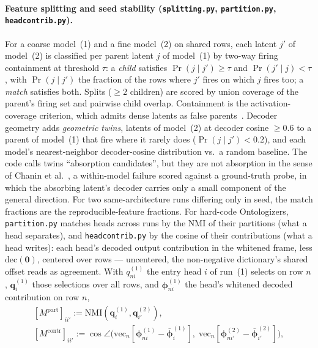 \paragraph{Feature splitting and seed stability (\texttt{splitting.py},
\texttt{partition.py}, \texttt{headcontrib.py}).}
For a coarse model~(1) and a fine model~(2) on shared rows, each latent
$j'$ of model~(2) is classified per parent latent $j$ of model~(1) by
two-way firing containment at threshold $\tau$: a \emph{child} satisfies
$\Pr(j \mid j') \geq \tau$ and $\Pr(j' \mid j) < \tau$, with
$\Pr(j \mid j')$ the fraction of the rows where $j'$ fires on which $j$
fires too; a \emph{match} satisfies both. Splits
($\geq 2$ children) are scored by union coverage of the parent's firing
set and pairwise child overlap. Containment is the activation-coverage
criterion, which admits dense latents as false parents~\cite{cao2026}.
Decoder geometry adds \emph{geometric twins}, latents of model~(2) at
decoder cosine $\geq 0.6$ to a parent of model~(1) that fire where it
rarely does ($\Pr(j \mid j') < 0.2$), and each model's nearest-neighbor
decoder-cosine distribution vs.\ a random baseline. The code calls twins
``absorption candidates'', but they are not absorption in the sense of
Chanin et al.~\cite{chanin2025}, a within-model failure scored against a
ground-truth probe, in which the absorbing latent's decoder carries only a
small component of the general direction. For
two same-architecture runs differing only in seed, the match fractions
are the reproducible-feature fractions. For hard-code Ontologizers,
\texttt{partition.py} matches heads across runs by the NMI of their
partitions (what a head separates), and \texttt{headcontrib.py} by the
cosine of their contributions (what a head writes): each head's decoded
output contribution in the whitened frame, less $\mathrm{dec}(\mathbf{0})$,
centered over rows --- uncentered, the non-negative dictionary's shared
offset reads as agreement. With $q^{(1)}_{ni}$ the entry head $i$ of
run~(1) selects on row $n$, $\mathbf{q}^{(1)}_i$ those selections over
all rows, and $\boldsymbol{\phi}^{(1)}_{ni}$ the head's whitened decoded
contribution on row $n$,
\begin{equation}
	\begin{gathered}
	[M^{\mathrm{part}}]_{ii'} := \mathrm{NMI}(\mathbf{q}^{(1)}_{i}, \mathbf{q}^{(2)}_{i'}),
	\\
	[M^{\mathrm{contr}}]_{ii'} := \cos\angle\!\big(\mathrm{vec}_{n}[\boldsymbol{\phi}^{(1)}_{ni}
	- \bar{\boldsymbol{\phi}}^{(1)}_{i}],\; \mathrm{vec}_{n}[\boldsymbol{\phi}^{(2)}_{ni'}
	- \bar{\boldsymbol{\phi}}^{(2)}_{i'}]\big),
	\end{gathered}
	\label{eq:headmatch}
\end{equation}
